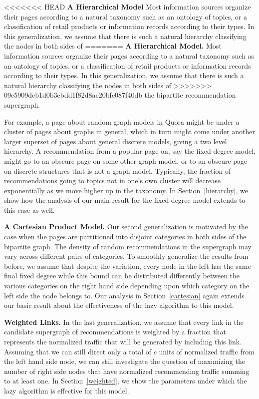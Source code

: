 <<<<<<< HEAD
{\bf A Hierarchical Model} 
Most information sources organize their pages according to a natural taxonomy
such as an ontology of topics, or a classification of retail products or
information records according to their types. In this generalization, we assume
that there is such a natural hierarchy classifying the nodes in both sides of
=======
{\bf A Hierarchical Model.} 
Most information sources organize their pages according to a natural taxonomy
such as an ontology of topics, or a classification of retail products or
information records according to their types. In this generalization, we assume
that there is such a natural hierarchy classifying the nodes in both sides of
>>>>>>> 09e5909dcb1d0b3ebdd1f82d8ac20bfe087f40db
the bipartite recommendation supergraph. 


For example, a page about random graph models in Quora might be under a cluster
of pages about graphs in general, which in turn might come under another larger
superset of pages about general discrete models, giving a two level hierarchy.
A recommendation from a popular page on, say the fixed-degree model, might go to
an obscure page on some other graph model, or to an obscure page on discrete
structures that is not a graph model. Typically, the fraction of recommendations
going to topics not in one's own cluster will decrease exponentially as we move
higher up in the taxonomy. In Section~\ref{hierarchy}, we show how the analysis
of our main result for the fixed-degree model extends to this case as well. \vs

{\bf A Cartesian Product Model.}
Our second generalization is motivated by the case when the pages are
partitioned into disjoint categories in both sides of the bipartite graph. The
density of random recommendations in the supergraph may vary across different
pairs of categories. To smoothly generalize the results from before, we assume
that despite the variation, every node in the left has the same final fixed
degree while this bound can be distributed differently between the various
categories on the right hand side depending upon which category on the left side
the node belongs to.  Our analysis in Section~\ref{cartesian} again extends our
basic result about the effectiveness of the lazy algorithm to this model.\vs

{\bf Weighted Links.}
In the last generalization, we assume that every link in the candidate
supergraph of recommendations is weighted by a fraction that represents the
normalized traffic that will be generated by including this link. Assuming that
we can still direct only a total of $c$ units of normalized traffic from the
left hand side node, we can still investigate the question of maximizing the
number of right side nodes that have normalized recommending traffic summing to
at least one. In Section~\ref{weighted}, we show the parameters under which the
lazy algorithm is effective for this model. \vs

